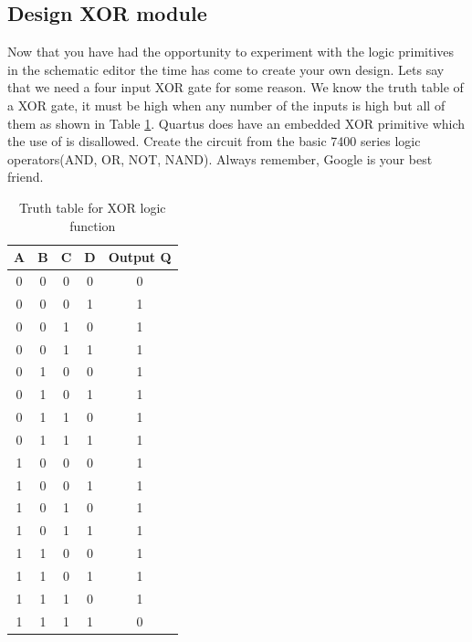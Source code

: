       \subsection{Design XOR module} 
        Now that you have had the opportunity to experiment with the logic primitives in the schematic editor the time has come to create your own design. Lets say that we need a four input XOR gate for some reason. We know the truth table of a XOR gate, it must be high when any number of the inputs is high but all of them as shown in Table \ref{XORTT}. Quartus does have an embedded XOR primitive which the use of is disallowed. Create the circuit from the basic 7400 series logic operators(AND, OR, NOT, NAND). Always remember, Google is your best friend. 
        \begin{table}[htpb]
          \renewcommand{\arraystretch}{1.3}
            \caption{Truth table for XOR logic function}
            \label{XORTT}
            \centering
            \begin{tabular}{c|c|c|c|c}
            \hline
              A &B &C &D &Output Q \\
            \hline\hline
              0 &0 &0 &0 &0\\
              0 &0 &0 &1 &1\\
              0 &0 &1 &0 &1\\
              0 &0 &1 &1 &1\\
              0 &1 &0 &0 &1\\
              0 &1 &0 &1 &1\\
              0 &1 &1 &0 &1\\
              0 &1 &1 &1 &1\\
              1 &0 &0 &0 &1\\
              1 &0 &0 &1 &1\\
              1 &0 &1 &0 &1\\
              1 &0 &1 &1 &1\\
              1 &1 &0 &0 &1\\
              1 &1 &0 &1 &1\\
              1 &1 &1 &0 &1\\
              1 &1 &1 &1 &0\\
            \hline
            \end{tabular}
          \end{table}
      
